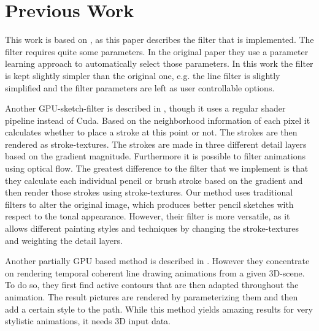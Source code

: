 \section{Previous Work}
This work is based on \cite{mainPaper}, as this paper describes the filter that
is implemented. The filter requires quite some parameters. In the original paper
they use a parameter learning approach to automatically select those parameters.
In this work the filter is kept slightly simpler than the original one, e.g.
the line filter is slightly simplified and the filter parameters are left as
user controllable options.

Another GPU-sketch-filter is described in \cite{Lu:2010:IPS}, though it uses
a regular shader pipeline instead of Cuda. Based on the neighborhood information
of each pixel it calculates whether to place a stroke at this point or not. The
strokes are then rendered as stroke-textures. The strokes are made in three different
detail layers based on the gradient magnitude. Furthermore it is possible to filter
animations using optical flow. The greatest difference to the filter that we
implement is that they calculate each individual pencil or brush stroke based on
the gradient and then render those strokes using stroke-textures. Our method
uses traditional filters to alter the original image, which produces better
pencil sketches with respect to the tonal appearance. However, their filter is
more versatile, as it allows different painting styles and techniques by
changing the stroke-textures and weighting the detail layers.


Another partially GPU based method is described in \cite{Benard:2012:ASC}. However
they concentrate on rendering temporal coherent line drawing animations from a
given 3D-scene. To do so, they first find active contours that are then adapted throughout
the animation. The result pictures are rendered by parameterizing them and then
add a certain style to the path. While this method yields amazing results for
very stylistic animations, it needs 3D input data.
